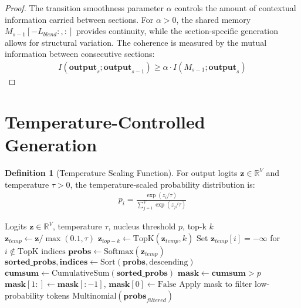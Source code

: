 \documentclass[12pt]{article}
\theoremstyle{definition}
\newtheorem{definition}{Definition}
\begin{document}
\begin{proof}
The transition smoothness parameter $\alpha$ controls the amount of contextual information carried between sections. For $\alpha > 0$, the shared memory $M_{s-1}[-L_{blend}:, :]$ provides continuity, while the section-specific generation allows for structural variation. The coherence is measured by the mutual information between consecutive sections:
\begin{align}
I(\mathbf{output}_s; \mathbf{output}_{s-1}) \geq \alpha \cdot I(M_{s-1}; \mathbf{output}_s)
\end{align}
\end{proof}

\section{Temperature-Controlled Generation}

\begin{definition}[Temperature Scaling Function]
For output logits $\mathbf{z} \in \mathbb{R}^V$ and temperature $\tau > 0$, the temperature-scaled probability distribution is:
\begin{align}
p_i = \frac{\exp(z_i/\tau)}{\sum_{j=1}^V \exp(z_j/\tau)}
\end{align}
\end{definition}

\begin{algorithm}[H]
\caption{Nucleus Sampling with Temperature Control}
\label{alg:nucleus_sampling}
\begin{algorithmic}[1]
\REQUIRE Logits $\mathbf{z} \in \mathbb{R}^V$, temperature $\tau$, nucleus threshold $p$, top-k $k$
\STATE $\mathbf{z}_{temp} \leftarrow \mathbf{z} / \max(0.1, \tau)$ 
    \STATE $\mathbf{z}_{top-k} \leftarrow \text{TopK}(\mathbf{z}_{temp}, k)$
    \STATE Set $\mathbf{z}_{temp}[i] = -\infty$ for $i \notin \text{TopK indices}$
\ENDIF
\STATE $\mathbf{probs} \leftarrow \text{Softmax}(\mathbf{z}_{temp})$
\STATE $\mathbf{sorted\_probs}, \mathbf{indices} \leftarrow \text{Sort}(\mathbf{probs}, \text{descending})$
\STATE $\mathbf{cumsum} \leftarrow \text{CumulativeSum}(\mathbf{sorted\_probs})$
\STATE $\mathbf{mask} \leftarrow \mathbf{cumsum} > p$
\STATE $\mathbf{mask}[1:] \leftarrow \mathbf{mask}[:-1]$, $\mathbf{mask}[0] \leftarrow \text{False}$
\STATE Apply mask to filter low-probability tokens
\RETURN $\text{Multinomial}(\mathbf{probs}_{filtered})$
\end{algorithmic}
\end{algorithm}
\end{document}
